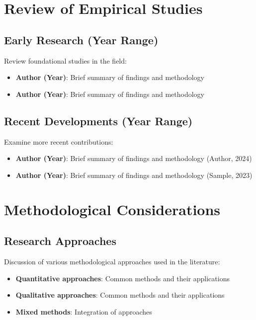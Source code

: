 \documentclass[
  12pt,
  letterpaper,
  12pt,
  letterpaper,
  oneside]{report}
\providecommand{\tightlist}{%
  \setlength{\itemsep}{0pt}\setlength{\parskip}{0pt}}
\begin{document}
\section{Review of Empirical Studies}\label{review-of-empirical-studies}

\subsection{Early Research (Year
Range)}\label{early-research-year-range}

Review foundational studies in the field:

\begin{itemize}
\tightlist
\item
  \textbf{Author (Year)}: Brief summary of findings and methodology
\item
  \textbf{Author (Year)}: Brief summary of findings and methodology
\end{itemize}

\subsection{Recent Developments (Year
Range)}\label{recent-developments-year-range}

Examine more recent contributions:

\begin{itemize}
\tightlist
\item
  \textbf{Author (Year)}: Brief summary of findings and methodology
  (Author, 2024)
\item
  \textbf{Author (Year)}: Brief summary of findings and methodology
  (Sample, 2023)
\end{itemize}

\section{Methodological
Considerations}\label{methodological-considerations}

\subsection{Research Approaches}\label{research-approaches}

Discussion of various methodological approaches used in the literature:

\begin{itemize}
\tightlist
\item
  \textbf{Quantitative approaches}: Common methods and their
  applications
\item
  \textbf{Qualitative approaches}: Common methods and their applications
\item
  \textbf{Mixed methods}: Integration of approaches
\end{itemize}
\end{document}
